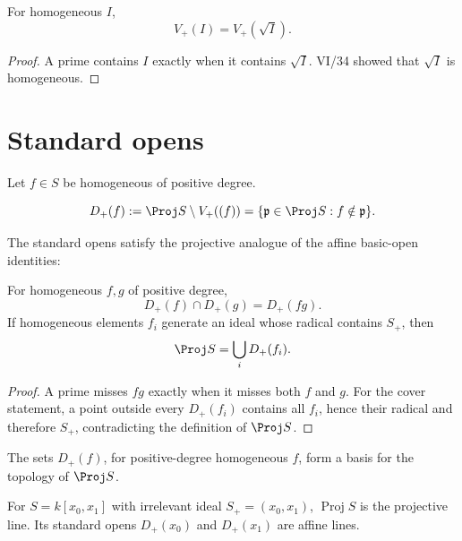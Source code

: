\begin{proposition}
For homogeneous \(I\),
\[
V_+(I)=V_+(\sqrt I).
\]
\end{proposition}

\begin{proof}
A prime contains \(I\) exactly when it contains \(\sqrt I\).  VI/34 showed that \(\sqrt I\) is homogeneous.
\end{proof}



\section{Standard opens}
Let \(f\in S\) be homogeneous of positive degree.
\begin{definition}
\[
D_+(f):=\Proj S\setminus V_+((f))
      =\{\mathfrak p\in\Proj S:f\notin\mathfrak p\}.
\]
\end{definition}

The standard opens satisfy the projective analogue of the affine basic-open identities:
\begin{proposition}
For homogeneous \(f,g\) of positive degree,
\[
D_+(f)\cap D_+(g)=D_+(fg).
\]
If homogeneous elements \(f_i\) generate an ideal whose radical contains \(S_+\), then
\[
\Proj S=\bigcup_iD_+(f_i).
\]
\end{proposition}

\begin{proof}
A prime misses \(fg\) exactly when it misses both \(f\) and \(g\).  For the cover statement, a point outside every \(D_+(f_i)\) contains all \(f_i\), hence their radical and therefore \(S_+\), contradicting the definition of \(\Proj S\).
\end{proof}

\begin{corollary}
The sets \(D_+(f)\), for positive-degree homogeneous \(f\), form a basis for the topology of \(\Proj S\).
\end{corollary}



\begin{example}\label{ex:vi35-expand-01}
For $S=k[x_0,x_1]$ with irrelevant ideal $S_+=(x_0,x_1)$, $\operatorname{Proj}S$ is the projective line.  Its standard opens $D_+(x_0)$ and $D_+(x_1)$ are affine lines.
\end{example}

